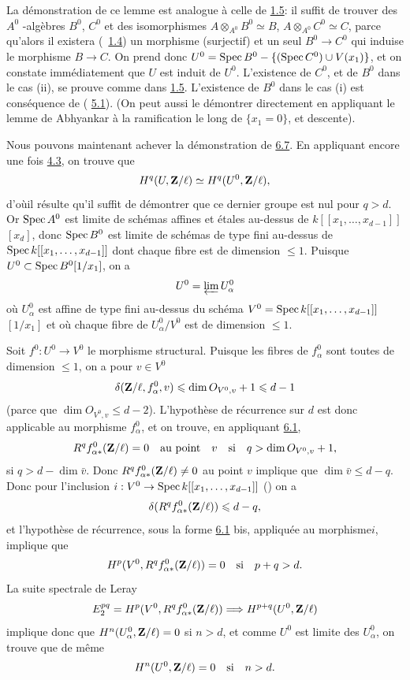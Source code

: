 \documentclass[10pt]{../fichiers-configuration-latex/smfart}
\begin{document}
La démonstration de ce lemme est analogue à celle de \hyperref[XIX.lem1.5]{1.5}:
il suffit de trouver des $A^{0}$ -algèbres $B^{0}$, $C^{0}$ et des
isomorphismes $A\otimes_{A^{0}}B^{0}\simeq B$,
$A\otimes_{A^{0}}C^{0}\simeq C$, parce qu'alors il existera
(\cite{SGA4-19:3}~\hyperref[XIX.subsec1.4]{1.4}) un morphisme (surjectif) et un seul
$B^{0}\rightarrow C^{0}$ qui induise le morphisme $B\rightarrow C$. On
prend donc $U^{0}=\operatorname{Spec} B^{0}-\{(\operatorname{Spec} C^{0})\cup V(x_{1})\}$, et on
constate immédiatement que $U$ est induit de $U^{0}$. L'existence de
$C^{0}$, et de $B^{0}$ dans le cas (ii), se prouve comme dans
\hyperref[XIX.lem1.5]{1.5}. L'existence de $B^{0}$ dans le cas (i) est
conséquence de (\cite{SGA4-19:3} 
\hyperref[XIX.thm5.1]{5.1}). (On peut aussi le démontrer directement en
appliquant le lemme 
de Abhyankar à la ramification le long de $\{x_{1}=0\}$, et descente).

Nous pouvons maintenant achever la démonstration de
\hyperref[XIX.lem6.7]{6.7}. En appliquant 
encore une fois \hyperref[XIX.cor4.3]{4.3}, on trouve que
$$
H^{q}(U,\mathbf{Z}/\ell)\simeq H^{q}(U^{0},\mathbf{Z}/\ell){},
$$
d'où\pageoriginale il résulte qu'il suffit de démontrer que ce dernier
groupe est nul pour $q>d$. Or $\operatorname{Spec} A^{0}$ est limite de schémas
affines et étales au-dessus de $k[[x_{1},\ldots,x_{d-1}]]$ $[x_{d}]$,
donc $\operatorname{Spec} B^{0}$ est limite de schémas de type fini au-dessus de
$\operatorname{Spec} k[[x_{1},\dots,x_{d-1}]]$ dont chaque fibre est de dimension
$\leq 1$. Puisque $U^{0}\subset \operatorname{Spec} B^{0}[1/x_{1}]$, on a
$$
U^{0}=\varprojlim U^{0}_{\alpha}
$$
où $U^{0}_{\alpha}$ est affine de type fini au-dessus du schéma
$V^{0}=\operatorname{Spec} k[[x_{1},\dots, x_{d-1}]]$ $[1/x_{1}]$ et où chaque
fibre de $U^{0}_{\alpha}/V^{0}$ est de dimension $\leq 1$.

Soit $f^{0}:U^{0}\rightarrow V^{0}$ le morphisme structural. Puisque
les fibres de $f^{0}_{\alpha}$ sont toutes de dimension $\leq 1$, on a
pour $v\in V^{0}$
$$
\delta(\mathbf{Z}/\ell, f^{0}_{\alpha},v)\leqslant \dim O_{V^{0},v}+1\leqslant
d-1
$$
(parce que $\dim O_{V^{0},v}\leq d-2$). L'hypothèse de récurrence sur
$d$ est donc applicable au morphisme $f^{0}_{\alpha}$, et on trouve, en
appliquant \hyperref[XIX.thm6.1]{6.1},
$$
R^{q}f^{0}_{\alpha\ast}(\mathbf{Z}/\ell)=0\quad\text{\rm au
point}\quad v\quad\text{\rm si}\quad q>\dim O_{V^{0},v}+1{},
$$
\ie si $q>d-\dim\bar{v}$. Donc $R^{q}f^{0}_{\alpha
\ast}(\mathbf{Z}/\ell)\neq 0$ au point $v$ implique que $\dim
\bar{v}\leq d-q$. Donc pour l'inclusion $i:V^{0}\rightarrow \operatorname{Spec}
k[[x_{1},\dots, x_{d-1}]]$ (\cf {}) on a
$$
\delta (R^{q}f^{0}_{\alpha\ast}(\mathbf{Z}/\ell))\leqslant d-q{},
$$
et l'hypothèse de récurrence, sous la forme \hyperref[XIX.thm6.1]{6.1} bis, appliquée au
morphisme\pageoriginale $i$, implique que
$$
H^{p}(V^{0},R^{q}f^{0}_{\alpha\ast}(\mathbf{Z}/\ell))=0\quad\text{\rm
si}\quad p+q>d{}.
$$
La suite spectrale de Leray
$$
E^{pq}_{2}=H^{p}(V^{0},R^{q}f^{0}_{\alpha\ast}(\mathbf{Z}/\ell))\Longrightarrow
H^{p+q}(U^{0},\mathbf{Z}/\ell)
$$
implique donc que $H^{n}(U^{0}_{\alpha},\mathbf{Z}/\ell)=0$ si $n>d$,
et comme $U^{0}$ est limite des $U^{0}_{\alpha}$, on trouve que de
même
$$
H^{n}(U^{0},\mathbf{Z}/\ell)=0\quad\text{\rm si}\quad n>d{}.
$$
\end{document}
